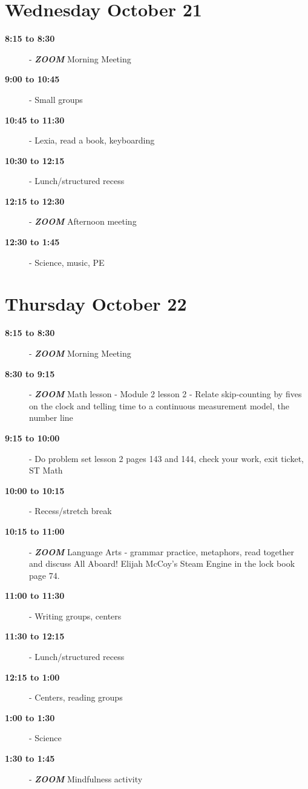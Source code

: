 \documentclass{article}
\newcommand{\timespan}[2]{\textbf{#1 to #2}}
\newcommand{\datepage}[1]{\newpage\section*{\centering\Huge{#1}}}
\newcommand{\zoom}{\textbf{\textit{ZOOM}\quad}}
\begin{document}
\datepage{Wednesday October 21}
\begin{description}
  \item[\timespan{8:15}{8:30}] - \zoom
    Morning Meeting
  \item[\timespan{9:00}{10:45}] -
    Small groups
  \item[\timespan{10:45}{11:30}] -
    Lexia, read a book, keyboarding
  \item[\timespan{10:30}{12:15}] -
    Lunch/structured recess
  \item[\timespan{12:15}{12:30}] - \zoom
    Afternoon meeting
  \item[\timespan{12:30}{1:45}] -
    Science, music, PE
\end{description}

\datepage{Thursday October 22}
\begin{description}
  \item[\timespan{8:15}{8:30}] - \zoom
    Morning Meeting
  \item[\timespan{8:30}{9:15}] - \zoom
    Math lesson - Module 2 lesson 2 - Relate skip-counting by fives on the
    clock and telling time to a continuous measurement model, the number line
  \item[\timespan{9:15}{10:00}] -
    Do problem set lesson 2 pages 143 and 144,  check your work, exit ticket,
    ST Math
  \item[\timespan{10:00}{10:15}] -
    Recess/stretch break
  \item[\timespan{10:15}{11:00}] - \zoom
    Language Arts - grammar practice, metaphors, read together and discuss All
    Aboard! Elijah McCoy's Steam Engine in the lock book page 74.
  \item[\timespan{11:00}{11:30}] -
    Writing groups, centers
  \item[\timespan{11:30}{12:15}] -
    Lunch/structured recess
  \item[\timespan{12:15}{1:00}] -
    Centers, reading groups
  \item[\timespan{1:00}{1:30}] -
    Science
  \item[\timespan{1:30}{1:45}] - \zoom
    Mindfulness activity
\end{description}
\end{document}
